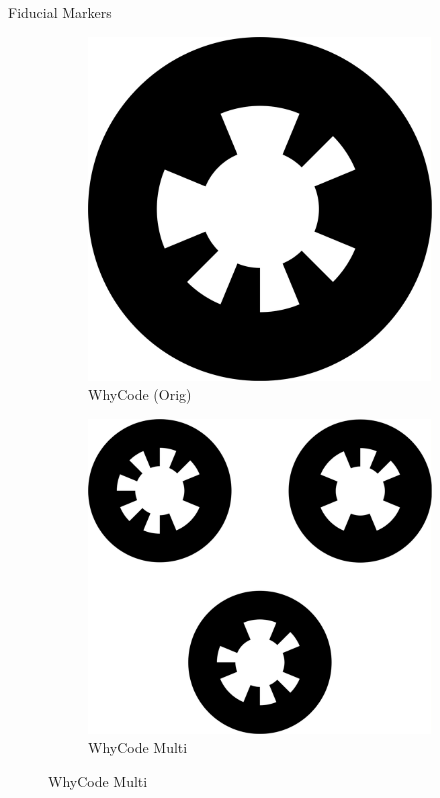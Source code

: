 \documentclass[aspectratio=169]{beamer}
\begin{document}
\begin{frame}{Fiducial Markers}
\begin{figure}[]
\begin{subfigure}[b]{0.2\linewidth}
		\includegraphics[width=\textwidth]{./images/whycode_20_8}
		\caption{WhyCode (Orig)}
		\label{figure:whycode_single}
	    \end{subfigure}
		\hspace{0.05\linewidth}
	    \begin{subfigure}[b]{0.2\linewidth}
		\includegraphics[width=\textwidth]{./images/whycode_multi}
		\caption{WhyCode Multi}
		\label{figure:whycode_bundle}
	    \end{subfigure}
	    \label{figure:marker_setup}
	\end{figure}
	\vspace*{\fill}
\end{frame}
\end{document}
